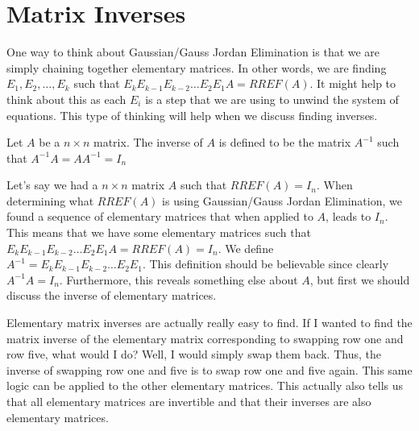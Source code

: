 \section{Matrix Inverses}
One way to think about Gaussian/Gauss Jordan Elimination is that we are simply chaining together elementary matrices. In other words, we are finding $E_1, E_2,\ldots, E_k$ such that $E_kE_{k-1}E_{k-2}\ldots E_2E_1A=RREF(A)$. It might help to think about this as each $E_i$ is a step that we are using to unwind the system of equations. This type of thinking will help when we discuss finding inverses.
\begin{definition}
    Let $A$ be a $n\times n$ matrix. The inverse of $A$ is defined to be the matrix $A^{-1}$ such that $A^{-1}A=AA^{-1}=I_n$
\end{definition}
Let's say we had a $n\times n$ matrix $A$ such that $RREF(A)=I_n$. When determining what $RREF(A)$ is using Gaussian/Gauss Jordan Elimination, we found a sequence of elementary matrices that when applied to $A$, leads to $I_n$. This means that we have some elementary matrices such that $E_kE_{k-1}E_{k-2}\ldots E_2E_1A=RREF(A)=I_n$. We define $A^{-1}=E_kE_{k-1}E_{k-2}\ldots E_2E_1$. This definition should be believable since clearly $A^{-1}A=I_n$. Furthermore, this reveals something else about $A$, but first we should discuss the inverse of elementary matrices.

Elementary matrix inverses are actually really easy to find. If I wanted to find the matrix inverse of the elementary matrix corresponding to swapping row one and row five, what would I do? Well, I would simply swap them back. Thus, the inverse of swapping row one and five is to swap row one and five again. This same logic can be applied to the other elementary matrices. This actually also tells us that all elementary matrices are invertible and that their inverses are also elementary matrices.

